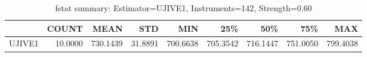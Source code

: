 \begin{table}[ht]
\centering
\caption{fstat summary: Estimator=UJIVE1, Instruments=142, Strength=0.60}
\begin{tabular}{lrrrrrrrr}
\toprule
 & COUNT & MEAN & STD & MIN & 25\% & 50\% & 75\% & MAX \\
\midrule
UJIVE1 & 10.0000 & 730.1439 & 31.8891 & 700.6638 & 705.3542 & 716.1447 & 751.0050 & 799.4038 \\
\bottomrule
\end{tabular}
\end{table}
